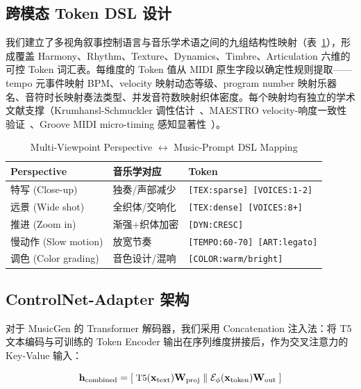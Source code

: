 \documentclass[conference]{IEEEtran}
\begin{document}
\subsection{跨模态 Token DSL 设计}

我们建立了多视角叙事控制语言与音乐学术语之间的九组结构性映射（表~\ref{tab:mapping}），形成覆盖 Harmony、Rhythm、Texture、Dynamics、Timbre、Articulation 六维的可控 Token 词汇表。每维度的 Token 值从 MIDI 原生字段以确定性规则提取——tempo 元事件映射 BPM、velocity 映射动态等级、program number 映射乐器名、音符时长映射奏法类型、并发音符数映射织体密度。每个映射均有独立的学术文献支撑（Krumhansl-Schmuckler 调性估计~\cite{krumhansl}、MAESTRO velocity-响度一致性验证~\cite{maestro}、Groove MIDI micro-timing 感知显著性~\cite{groove}）。

\begin{table}[htbp]
\centering\footnotesize
\setlength{\tabcolsep}{3pt}
\caption{Multi-Viewpoint Perspective $\leftrightarrow$ Music-Prompt DSL Mapping}
\label{tab:mapping}
\begin{tabularx}{\columnwidth}{@{}l >{\raggedright\arraybackslash}X >{\raggedright\arraybackslash}X@{}}
\toprule
\textbf{Perspective} & \textbf{音乐学对应} & \textbf{Token} \\
\midrule
特写 (Close-up) & 独奏/声部减少 & \texttt{[TEX:sparse] [VOICES:1-2]} \\
远景 (Wide shot) & 全织体/交响化 & \texttt{[TEX:dense] [VOICES:8+]} \\
推进 (Zoom in) & 渐强+织体加密 & \texttt{[DYN:CRESC]} \\
慢动作 (Slow motion) & 放宽节奏 & \texttt{[TEMPO:60-70] [ART:legato]} \\
调色 (Color grading) & 音色设计/混响 & \texttt{[COLOR:warm/bright]} \\
\bottomrule
\end{tabularx}
\end{table}

\subsection{ControlNet-Adapter 架构}

对于 MusicGen 的 Transformer 解码器，我们采用 Concatenation 注入法：将 T5 文本编码与可训练的 Token Encoder 输出在序列维度拼接后，作为交叉注意力的 Key-Value 输入：

\begin{equation}\small
\mathbf{h}_{\text{combined}} = [\;\text{T5}(\mathbf{x}_{\text{text}})\mathbf{W}_{\text{proj}}\;\|\;
\mathcal{E}_{\phi}(\mathbf{x}_{\text{token}})\mathbf{W}_{\text{out}}\;]
\end{equation}
\end{document}
